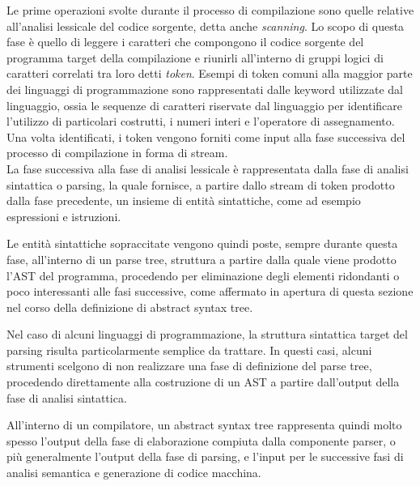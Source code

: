 Le prime operazioni svolte durante il processo di compilazione sono quelle
relative all’analisi lessicale del codice sorgente, detta anche
\textit{scanning}. Lo scopo di questa fase è quello di leggere i caratteri che
compongono il codice sorgente del programma target della compilazione e riunirli
all’interno di gruppi logici di caratteri correlati tra loro detti
\textit{token}. Esempi di token comuni alla maggior parte dei linguaggi di
programmazione sono rappresentati dalle keyword utilizzate dal linguaggio, ossia
le sequenze di caratteri riservate dal linguaggio per identificare l'utilizzo di
particolari costrutti, i numeri interi e l’operatore di assegnamento. Una volta
identificati, i token vengono forniti come input alla fase successiva del
processo di compilazione in forma di stream.\\

La fase successiva alla fase di analisi lessicale è rappresentata dalla fase di
analisi sintattica o parsing, la quale fornisce, a partire dallo stream di token
prodotto dalla fase precedente, un insieme di entità sintattiche, come ad
esempio espressioni e istruzioni.

Le entità sintattiche sopraccitate vengono quindi poste, sempre durante questa
fase, all’interno di un parse tree, struttura a partire dalla quale viene
prodotto l’AST del programma, procedendo per eliminazione degli elementi
ridondanti o poco interessanti alle fasi successive, come affermato in apertura
di questa sezione nel corso della definizione di abstract syntax tree.

Nel caso di alcuni linguaggi di programmazione, la struttura sintattica target
del parsing risulta particolarmente semplice da trattare. In questi casi, alcuni
strumenti scelgono di non realizzare una fase di definizione del parse tree,
procedendo direttamente alla costruzione di un AST a partire dall’output della
fase di analisi sintattica.

All’interno di un compilatore, un abstract syntax tree rappresenta quindi molto
spesso l’output della fase di elaborazione compiuta dalla componente parser, o
più generalmente l’output della fase di parsing, e l’input per le successive
fasi di analisi semantica e generazione di codice macchina.

